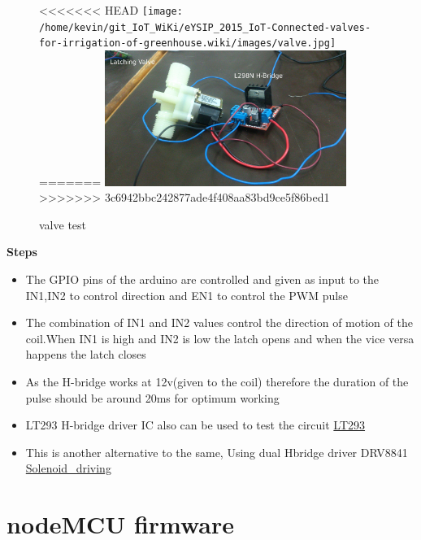 \documentclass[16pt]{article}
\begin{document}
\begin{figure}

\hspace{2cm}
<<<<<<< HEAD
\texttt{[image: /home/kevin/git\_IoT\_WiKi/eYSIP\_2015\_IoT-Connected-valves-for-irrigation-of-greenhouse.wiki/images/valve.jpg]}
=======
\includegraphics[width=0.7\textwidth]{images/valve.jpg}
>>>>>>> 3c6942bbc242877ade4f408aa83bd9ce5f86bed1
\caption{valve test}
\end{figure}

\textbf{Steps}

\begin{itemize}

\item
  The GPIO pins of the arduino are controlled and given as input to the
  IN1,IN2 to control direction and EN1 to control the PWM pulse
\item
  The combination of IN1 and IN2 values control the direction of motion
  of the coil.When IN1 is high and IN2 is low the latch opens and when
  the vice versa happens the latch closes
\item
  As the H-bridge works at 12v(given to the coil) therefore the duration
  of the pulse should be around 20ms for optimum working
\item
  LT293 H-bridge driver IC also can be used to test the
  circuit \href{http://www.ti.com/lit/ds/symlink/l293.pdf}{LT293}
\item
  This is another alternative to the same, Using dual Hbridge driver
  DRV8841
  \href{http://www.ti.com/lit/an/slva460/slva460.pdf}{Solenoid\_driving}
\end{itemize}



\vspace{19cm}
\section{nodeMCU firmware}
\vspace{0.5cm}
\end{document}
